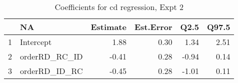 \begin{table}[ht]
\centering
\begin{tabular}{rlrrrr}
  \hline
 & NA & Estimate & Est.Error & Q2.5 & Q97.5 \\ 
  \hline
1 & Intercept & 1.88 & 0.30 & 1.34 & 2.51 \\ 
  2 & orderRD\_RC\_ID & -0.41 & 0.28 & -0.94 & 0.14 \\ 
  3 & orderRD\_ID\_RC & -0.45 & 0.28 & -1.01 & 0.11 \\ 
   \hline
\end{tabular}
\caption{Coefficients for cd regression, Expt 2} 
\end{table}
